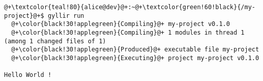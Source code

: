 \begin{lstlisting}[style=bashVerb, escapechar=@+]
@+\textcolor{teal!80}{alice@dev}@+:~@+\textcolor{green!60!black}{/my-project}@+$ gyllir run
  @+\color{black!30!applegreen}{Compiling}@+ my-project v0.1.0
  @+\color{black!30!applegreen}{Compiling}@+ 1 modules in thread 1 (among 1 changed files of 1)
  @+\color{black!30!applegreen}{Produced}@+ executable file my-project
  @+\color{black!30!applegreen}{Executing}@+ project my-project v0.1.0

Hello World !
\end{lstlisting}

\vfill
\pagebreak
